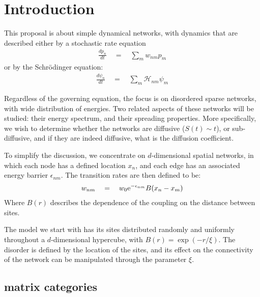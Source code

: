 \chapter{Introduction}


This proposal is about simple dynamical networks, with dynamics
that are described either by a stochastic rate equation
%
\begin{align}
  \frac{dp_n}{dt} \quad = \quad \sum_m w_{nm}p_m
\end{align}
%
or by the Schr\"{o}dinger equation:
%
\begin{align}
  \frac{d\psi_n}{dt} \quad = \quad \sum_m \mathcal{H}_{nm}\psi_m
\end{align}
%

Regardless of the governing equation, the focus is
on disordered sparse networks, with wide distribution of energies. 
Two related aspects of these networks will be studied: their energy spectrum,
and their spreading properties. More specifically, we wish to determine
whether the networks are diffusive ($S(t)\sim t$), or sub-diffusive, and
if they are indeed diffusive, what is the diffusion coefficient. 




To simplify the discussion, we concentrate on $d$-dimensional spatial networks,
in which each node has a defined location $x_n$, and each edge has an associated 
energy barrier $\epsilon_{nm}$. The transition rates are then defined to be:
%
\begin{align}
w_{nm} \quad = \quad w_0 \mbox{e}^{-\epsilon_{nm}}B(x_n-x_m)
\end{align}
%
Where $B(r)$ describes the dependence of the coupling on the
distance between sites.


The model we start with has its sites distributed randomly and uniformly throughout
a $d$-dimensional hypercube, with $B(r) = \exp(-r/\xi)$. The disorder is defined by the location
of the sites, and its effect on the connectivity of the network can be manipulated through the 
parameter $\xi$. 



\section{matrix categories}\label{sec:matrix_categories}


